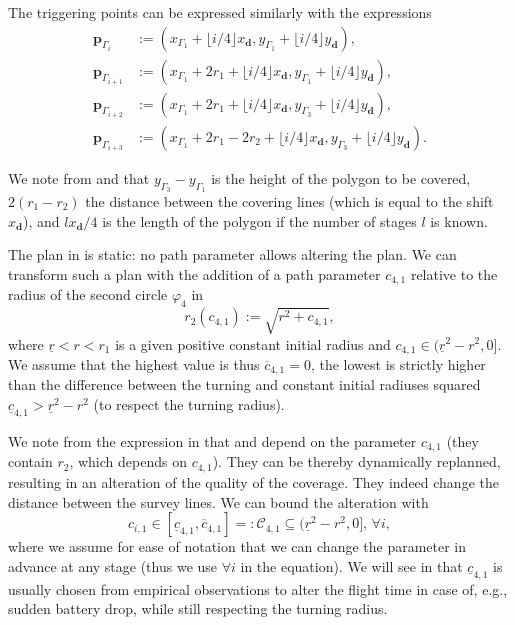 The triggering points can be expressed similarly with the expressions
\begin{subequations}\label{eq:trigs-gene}\begin{align}
  \mathbf{p}_{\Gamma_i}&:=(x_{\Gamma_1}+\lfloor i/4\rfloor x_\mathbf{d},y_{\Gamma_1}+\lfloor i/4\rfloor y_\mathbf{d}),\\
  \mathbf{p}_{\Gamma_{i+1}}&:=(x_{\Gamma_1}+2r_1+\lfloor i/4\rfloor x_\mathbf{d},y_{\Gamma_1}+\lfloor i/4\rfloor y_\mathbf{d}),\\
  \mathbf{p}_{\Gamma_{i+2}}&:=(x_{\Gamma_1}+2r_1+\lfloor i/4\rfloor x_\mathbf{d},y_{\Gamma_3}+\lfloor i/4\rfloor y_\mathbf{d}),\\
  \mathbf{p}_{\Gamma_{i+3}}&:=(x_{\Gamma_1}+2r_1-2r_2+\lfloor i/4\rfloor x_\mathbf{d},y_{\Gamma_3}+\lfloor i/4\rfloor y_\mathbf{d})\label{eq:last-trig-gene}.
\end{align}
\end{subequations}

We note from  and  that $y_{\Gamma_3}-y_{\Gamma_1}$ is the height of the polygon to be covered, $2(r_1-r_2)$ the distance between the covering lines (which is equal to the shift $x_\mathbf{d}$), and $lx_\mathbf{d}/4$ is the length of the polygon if the number of stages $l$ is known.

The plan in  is static: no path parameter allows altering the plan. We can transform such a plan with the addition of a path parameter $c_{4,1}$ relative to the radius of the second circle $\varphi_4$ in 
\begin{equation}\label{eq:radius-dynamic}
  r_2(c_{4,1}):=\sqrt{r^2+c_{4,1}},
\end{equation}
where $\underline{r}<r<r_1$ is a given positive constant initial radius and $c_{4,1}\in(\underline{r}^2-r^2,0]$. We assume that the highest value is thus $\overline{c}_{4,1}=0$, the lowest is strictly higher than the difference between the turning and constant initial radiuses squared $\underline{c}_{4,1}>\underline{r}^2-r^2$ (to respect the turning radius).

We note from the expression in  that  and  depend on the parameter $c_{4,1}$ (they contain $r_2$, which depends on $c_{4,1}$). They can be thereby dynamically replanned, resulting in an alteration of the quality of the coverage. They indeed change the distance between the survey lines.
We can bound the alteration with 
\begin{equation}\label{eq:path-const-c}
  c_{i,1}\in[\underline{c}_{4,1},\overline{c}_{4,1}]=:\mathcal{C}_{4,1}\subseteq(\underline{r}^2-r^2,0],\,\forall i,
\end{equation} 
where we assume for ease of notation that we can change the parameter in advance at any stage (thus we use $\forall i$ in the equation). We will see in  that $\underline{c}_{4,1}$ is usually chosen from empirical observations to alter the flight time in case of, e.g., sudden battery drop, while still respecting the turning radius.

